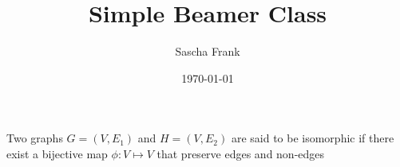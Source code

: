 \documentclass{beamer}
\begin{document}
\title{Simple Beamer Class} 

\author{Sascha Frank} 

\date{\today} 

\begin{frame}
\begin{definition}
Two graphs $G=(V,E_1)$ and $H= (V,E_2)$ are said to be isomorphic if there exist a bijective map $\phi : V \mapsto V$ that preserve edges and non-edges
\end{definition}
\end{frame}
\end{document}
